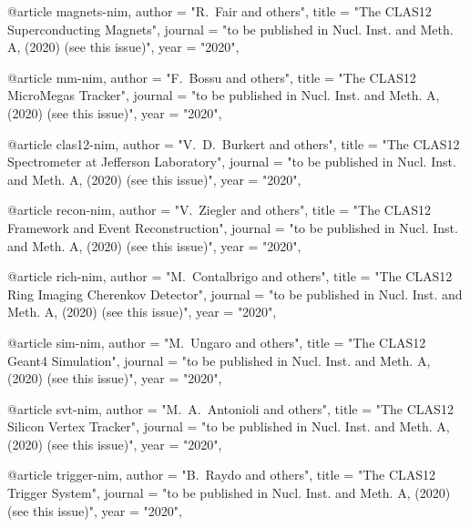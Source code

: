 @article{
magnets-nim,
author         = "R.~Fair and others",
title          = "{The CLAS12 Superconducting Magnets}",
journal        = "to be published in Nucl. Inst. and Meth. A, (2020) (see this issue)",
year           = "2020",
}

@article{
mm-nim,
author         = "F.~Bossu and others",
title          = "{The CLAS12 MicroMegas Tracker}",
journal        = "to be published in Nucl. Inst. and Meth. A, (2020) (see this issue)",
year           = "2020",
}

@article{
clas12-nim,
author         = "V.~D.~Burkert and others",
title          = "{The CLAS12 Spectrometer at Jefferson Laboratory}",
journal        = "to be published in Nucl. Inst. and Meth. A, (2020) (see this issue)",
year           = "2020",
}

@article{
recon-nim,
author         = "V.~Ziegler and others",
title          = "{The CLAS12 Framework and Event Reconstruction}",
journal        = "to be published in Nucl. Inst. and Meth. A, (2020) (see this issue)",
year           = "2020",
}

@article{
rich-nim,
author         = "M.~Contalbrigo and others",
title          = "{The CLAS12 Ring Imaging Cherenkov Detector}",
journal        = "to be published in Nucl. Inst. and Meth. A, (2020) (see this issue)",
year           = "2020",
}

@article{
sim-nim,
author         = "M.~Ungaro and others",
title          = "{The CLAS12 Geant4 Simulation}",
journal        = "to be published in Nucl. Inst. and Meth. A, (2020) (see this issue)",
year           = "2020",
}

@article{
svt-nim,
author         = "M.~A.~Antonioli and others",
title          = "{The CLAS12 Silicon Vertex Tracker}",
journal        = "to be published in Nucl. Inst. and Meth. A, (2020) (see this issue)",
year           = "2020",
}

@article{
trigger-nim,
author         = "B.~Raydo and others",
title          = "{The CLAS12 Trigger System}",
journal        = "to be published in Nucl. Inst. and Meth. A, (2020) (see this issue)",
year           = "2020",
}

